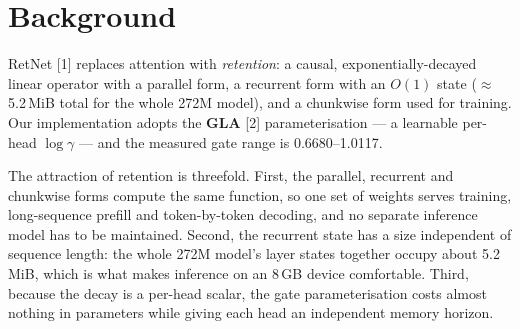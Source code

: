 \documentclass[11pt,openany]{article}
\begin{document}
%
%

\section{Background}
\label{sec:en-bg}

RetNet [1] replaces attention with \emph{retention}: a causal, exponentially-decayed linear
operator with a parallel form, a recurrent form with an $O(1)$ state
($\approx$ 5.2\,MiB total for the whole 272M model), and a chunkwise form used for
training. Our implementation adopts the \textbf{GLA} [2] parameterisation --- a learnable
per-head $\log\gamma$ --- and the measured gate range is 0.6680--1.0117.

The attraction of retention is threefold. First, the parallel, recurrent and chunkwise
forms compute the same function, so one set of weights serves training, long-sequence
prefill and token-by-token decoding, and no separate inference model has to be maintained.
Second, the recurrent state has a size independent of sequence length: the whole 272M
model's layer states together occupy about 5.2\,MiB, which is what makes inference on an
8\,GB device comfortable. Third, because the decay is a per-head scalar, the gate
parameterisation costs almost nothing in parameters while giving each head an independent
memory horizon.
\end{document}
